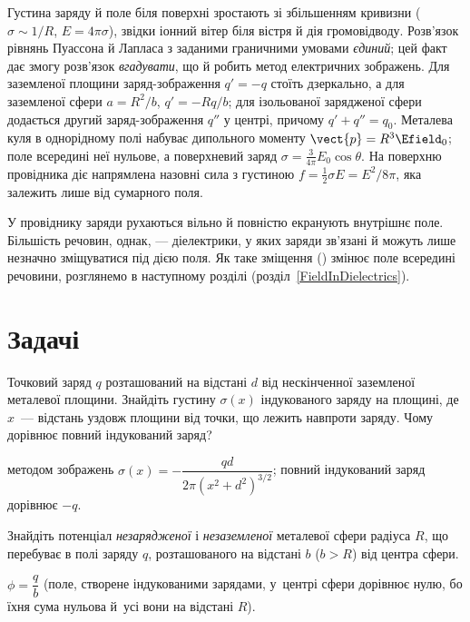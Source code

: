 Густина заряду й поле біля поверхні зростають зі збільшенням кривизни ($\sigma \sim 1/R$, $E = 4\pi\sigma$), звідки іонний вітер біля вістря й дія громовідводу. Розв'язок рівнянь Пуассона й Лапласа з заданими граничними умовами \emph{єдиний}; цей факт дає змогу розв'язок \emph{вгадувати}, що й робить метод електричних зображень. Для заземленої площини заряд-зображення $q' = -q$ стоїть дзеркально, а для заземленої сфери $a = R^2/b$, $q' = -Rq/b$; для ізольованої зарядженої сфери додається другий заряд-зображення $q''$ у центрі, причому $q' + q'' = q_0$. Металева куля в однорідному полі набуває дипольного моменту $\vect{p} = R^3\Efield_0$; поле всередині неї нульове, а поверхневий заряд $\sigma = \frac{3}{4\pi}E_0\cos\theta$. На поверхню провідника діє напрямлена назовні сила з густиною $f = \frac12\sigma E = E^2/8\pi$, яка залежить лише від сумарного поля.

У провіднику заряди рухаються вільно й повністю екранують внутрішнє поле. Більшість речовин, однак, --- діелектрики, у яких заряди зв'язані й можуть лише незначно зміщуватися під дією поля. Як таке зміщення () змінює поле всередині речовини, розглянемо в наступному розділі (розділ~\ref{FieldInDielectrics}).

\section*{Задачі}
{}


\begin{problem}%
    Точковий заряд $q$ розташований на відстані $d$ від нескінченної заземленої металевої
    площини. Знайдіть густину $\sigma(x)$ індукованого заряду на площині, де $x$~---
    відстань уздовж площини від точки, що лежить навпроти заряду. Чому дорівнює повний
    індукований заряд?
    \begin{solution}
    	методом зображень $\sigma(x)=-\dfrac{qd}{2\pi\left(x^2+d^2\right)^{3/2}}$; повний індукований заряд дорівнює $-q$.
    \end{solution}
\end{problem}

\begin{problem}%
    Знайдіть потенціал \emph{незарядженої} і \emph{незаземленої} металевої сфери радіуса $R$,
    що перебуває в полі заряду $q$, розташованого на відстані $b$ ($b > R$) від центра сфери.
    \begin{solution}
    	$\phi=\dfrac{q}{b}$ (поле, створене індукованими зарядами, у~центрі сфери дорівнює нулю, бо їхня сума нульова й~усі вони на відстані $R$).
    \end{solution}
\end{problem}

